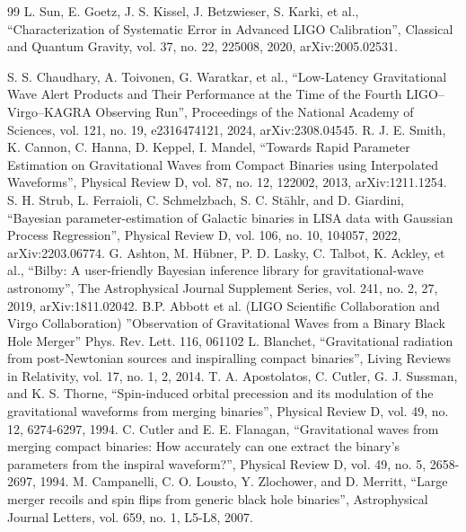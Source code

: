 \documentclass[12pt]{article}
\begin{document}
\begin{thebibliography}{99}
  L. Sun, E. Goetz, J. S. Kissel, J. Betzwieser, S. Karki, et al.,
  ``Characterization of Systematic Error in Advanced LIGO Calibration'',
  Classical and Quantum Gravity, vol. 37, no. 22, 225008, 2020,
  arXiv:2005.02531.

  S. S. Chaudhary, A. Toivonen, G. Waratkar, et al.,
  ``Low-Latency Gravitational Wave Alert Products and Their Performance at the Time of the Fourth LIGO--Virgo--KAGRA Observing Run'',
  Proceedings of the National Academy of Sciences, vol. 121, no. 19, e2316474121, 2024,
  arXiv:2308.04545.
  R. J. E. Smith, K. Cannon, C. Hanna, D. Keppel, I. Mandel,
  ``Towards Rapid Parameter Estimation on Gravitational Waves from Compact Binaries using Interpolated Waveforms'',
  Physical Review D, vol. 87, no. 12, 122002, 2013,
  arXiv:1211.1254.
  S. H. Strub, L. Ferraioli, C. Schmelzbach, S. C. Stählr, and D. Giardini,
  ``Bayesian parameter-estimation of Galactic binaries in LISA data with Gaussian Process Regression'',
  Physical Review D, vol. 106, no. 10, 104057, 2022,
  arXiv:2203.06774.
  G. Ashton, M. Hübner, P. D. Lasky, C. Talbot, K. Ackley, et al.,
  ``Bilby: A user-friendly Bayesian inference library for gravitational-wave astronomy'',
  The Astrophysical Journal Supplement Series, vol. 241, no. 2, 27, 2019,
  arXiv:1811.02042.
B.P. Abbott et al. (LIGO Scientific Collaboration and Virgo Collaboration)
''Observation of Gravitational Waves from a Binary Black Hole Merger''
Phys. Rev. Lett. 116, 061102
  L. Blanchet,
  ``Gravitational radiation from post-Newtonian sources and inspiralling compact binaries'',
  Living Reviews in Relativity, vol. 17, no. 1, 2, 2014.
  T. A. Apostolatos, C. Cutler, G. J. Sussman, and K. S. Thorne,
  ``Spin-induced orbital precession and its modulation of the gravitational waveforms from merging binaries'',
  Physical Review D, vol. 49, no. 12, 6274-6297, 1994.
  C. Cutler and E. E. Flanagan,
  ``Gravitational waves from merging compact binaries: How accurately can one extract the binary's parameters from the inspiral waveform?'',
  Physical Review D, vol. 49, no. 5, 2658-2697, 1994.
  M. Campanelli, C. O. Lousto, Y. Zlochower, and D. Merritt,
  ``Large merger recoils and spin flips from generic black hole binaries'',
  Astrophysical Journal Letters, vol. 659, no. 1, L5-L8, 2007.


\end{thebibliography}
\end{document}

